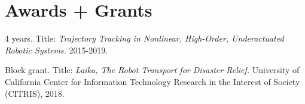 \documentclass[letterpaper]{deedy-resume} %
\begin{document}

{{}
  
{}
{}


\sectionspace %


  



\section{Awards + Grants}

\vspace{0.2cm}


\begin{etaremune}

\item {} 4 years. Title: {\it Trajectory Tracking in Nonlinear, High-Order, Underactuated Robotic Systems.} 2015-2019.
  
\item{} Block grant. Title: {\it Laika, The Robot Transport for Disaster Relief.} University of California Center for Information Technology Research in the Interest of Society (CITRIS), 2018.


\end{etaremune}}
\end{document}
